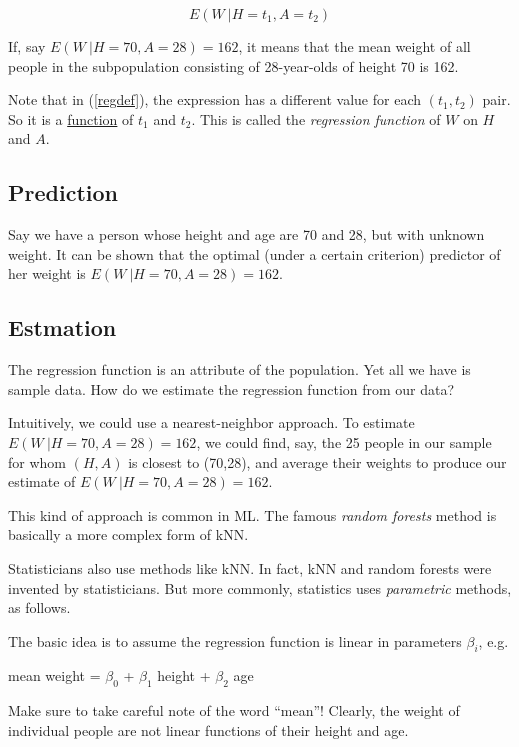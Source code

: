 \begin{equation}
\label{regdef}
E(W ~| H=t_1, A=t_2)
\end{equation}

If, say $E(W ~| H=70, A=28) = 162$, it means that the mean weight of all
people in the subpopulation consisting of 28-year-olds of height 70 is
162.

Note that in (\ref{regdef}), the expression has a different value for
each $(t_1,t_2)$ pair.  So it is a \underline{function} of $t_1$ and
$t_2$.  This is called the \textit{regression function} of $W$ on $H$
and $A$.

\subsection{Prediction}

Say we have a person whose height and age are 70 and 28, but with
unknown weight.  It can be shown that the optimal (under a certain
criterion) predictor of her weight is $E(W ~| H=70, A=28) = 162$.

\subsection{Estmation}

The regression function is an attribute of the population.  Yet all we
have is sample data.  How do we estimate the regression function from
our data?

Intuitively, we could use a nearest-neighbor approach.  To estimate
$E(W ~| H=70, A=28) = 162$, we could find, say, the 25 people in our
sample for whom $(H,A)$ is closest to (70,28), and average their weights
to produce our estimate of $E(W ~| H=70, A=28) = 162$.  

This kind of approach is common in ML.  The famous \textit{random
forests} method is basically a more complex form of kNN.

Statisticians also use methods like kNN.  In fact, kNN and random
forests were invented by statisticians.  But more commonly, statistics
uses \textit{parametric} methods, as follows.

The basic idea is to assume the regression function is linear in
parameters $\beta_i$, e.g.

mean weight = $\beta_0$ + $\beta_1$ height + $\beta_2$ age

Make sure to take careful note of the word ``mean''!  Clearly, the
weight of individual people are not linear functions of their height and
age.

